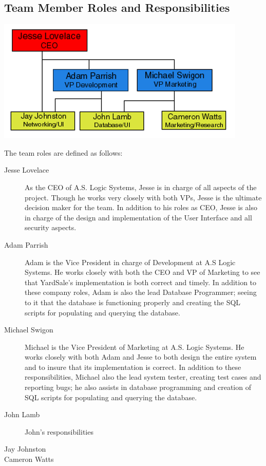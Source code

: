 \documentclass{report}
\begin{document}
    \subsection{Team Member Roles and Responsibilities}

    \includegraphics{organization.png}

    The team roles are defined as follows:
    \begin{description}
        \item[Jesse Lovelace] As the CEO of A.S. Logic Systems,
        Jesse is in charge of all aspects of the project.  Though
        he works very closely with both VPs, Jesse is the ultimate
        decision maker for the team.  In addition to his roles as
        CEO, Jesse is also in charge of the design and
        implementation of the User Interface and all security
        aspects.
        \item[Adam Parrish] Adam is the Vice President in charge
        of Development at A.S Logic Systems.  He works closely
        with both the CEO and VP of Marketing to see that
        YardSale's implementation is both correct and timely.  In
        addition to these company roles, Adam is also the lead
        Database Programmer; seeing to it that the database is
        functioning properly and creating the SQL scripts for
        populating and querying the database.
        \item[Michael Swigon] Michael is the Vice President of
        Marketing at A.S. Logic Systems.  He works closely with
        both Adam and Jesse to both design the entire system and
        to insure that its implementation is correct.  In addition
        to these responsibilities, Michael also the lead system
        tester, creating test cases and reporting bugs; he also
        assists in database programming and creation of SQL
        scripts for populating and querying the database.
        \item[John Lamb] John's responsibilities 
        \item[Jay Johnston]
        \item[Cameron Watts]
    \end{description}
\end{document}
